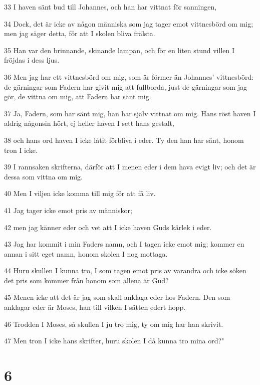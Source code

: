 \par 33 I haven sänt bud till Johannes, och han har vittnat för sanningen,
\par 34 Dock, det är icke av någon människa som jag tager emot vittnesbörd om mig; men jag säger detta, för att I skolen bliva frälsta.
\par 35 Han var den brinnande, skinande lampan, och för en liten stund villen I fröjdas i dess ljus.
\par 36 Men jag har ett vittnesbörd om mig, som är förmer än Johannes' vittnesbörd: de gärningar som Fadern har givit mig att fullborda, just de gärningar som jag gör, de vittna om mig, att Fadern har sänt mig.
\par 37 Ja, Fadern, som har sänt mig, han har själv vittnat om mig. Hans röst haven I aldrig någonsin hört, ej heller haven I sett hans gestalt,
\par 38 och hans ord haven I icke låtit förbliva i eder. Ty den han har sänt, honom tron I icke.
\par 39 I rannsaken skrifterna, därför att I menen eder i dem hava evigt liv; och det är dessa som vittna om mig.
\par 40 Men I viljen icke komma till mig för att få liv.
\par 41 Jag tager icke emot pris av människor;
\par 42 men jag känner eder och vet att I icke haven Guds kärlek i eder.
\par 43 Jag har kommit i min Faders namn, och I tagen icke emot mig; kommer en annan i sitt eget namn, honom skolen I nog mottaga.
\par 44 Huru skullen I kunna tro, I som tagen emot pris av varandra och icke söken det pris som kommer från honom som allena är Gud?
\par 45 Menen icke att det är jag som skall anklaga eder hos Fadern. Den som anklagar eder är Moses, han till vilken I sätten edert hopp.
\par 46 Trodden I Moses, så skullen I ju tro mig, ty om mig har han skrivit.
\par 47 Men tron I icke hans skrifter, huru skolen I då kunna tro mina ord?"

\chapter{6}

